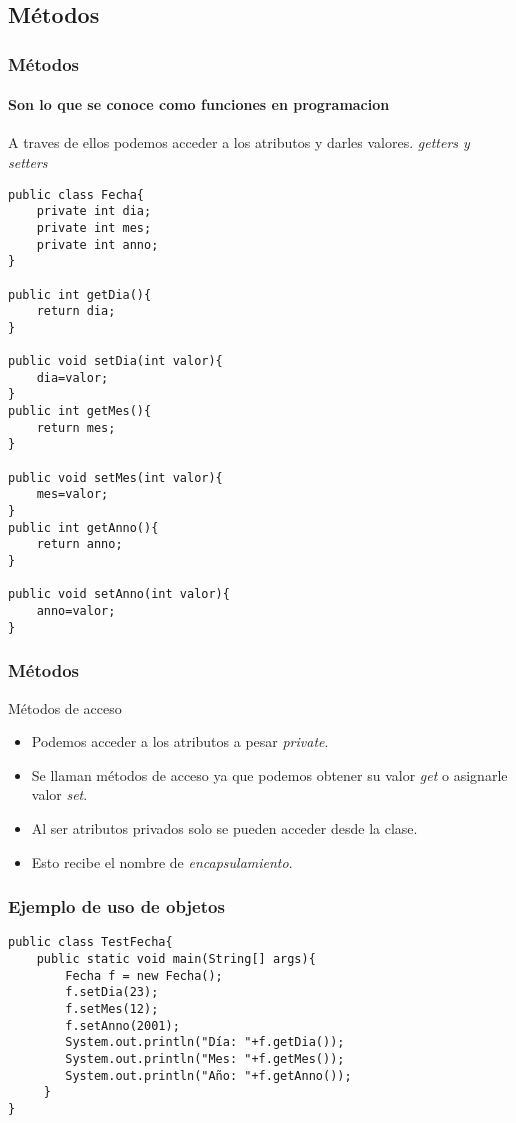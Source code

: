\documentclass{beamer}
\begin{document}
\subsection{Métodos}

\begin{frame}[fragile]
    \frametitle{Métodos}
    \framesubtitle{Son lo que se conoce como funciones en programacion}
    \pause
  \begin{scriptsize}
  A traves de ellos podemos acceder a los atributos y darles valores. \emph{getters y setters}
  \pause
\begin{verbatim}
public class Fecha{
    private int dia;
    private int mes;
    private int anno;
}

public int getDia(){
    return dia;
}

public void setDia(int valor){
    dia=valor;
}
public int getMes(){
    return mes;
}

public void setMes(int valor){
    mes=valor;
}
public int getAnno(){
    return anno;
}

public void setAnno(int valor){
    anno=valor;
}
\end{verbatim}
\end{scriptsize}

\end{frame}

\begin{frame}
    \frametitle{Métodos}
    \begin{block}{Métodos de acceso}
\begin{itemize}[<+-| alert@+>]
\item Podemos acceder a los atributos a pesar \emph{private}.
\item Se llaman métodos de acceso ya que podemos obtener su valor \emph{get} o asignarle valor \emph{set}.
\item Al ser atributos privados solo se pueden acceder desde la clase.
\item Esto recibe el nombre de \emph{encapsulamiento}.
\end{itemize}
\end{block}
\pause
\end{frame}

\begin{frame}[fragile]
\frametitle{Ejemplo de uso de objetos}
\begin{verbatim}
public class TestFecha{
    public static void main(String[] args){
        Fecha f = new Fecha();
        f.setDia(23);
        f.setMes(12);
        f.setAnno(2001);
        System.out.println("Día: "+f.getDia());
        System.out.println("Mes: "+f.getMes());
        System.out.println("Año: "+f.getAnno());
     }
}
\end{verbatim}
\end{frame}
\end{document}
